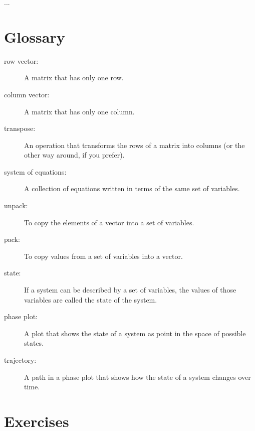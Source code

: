 ...

\section{Glossary}

\begin{description}

\item[row vector:] A matrix that has only one row.

\item[column vector:] A matrix that has only one column.

\item[transpose:] An operation that transforms the rows of a matrix
into columns (or the other way around, if you prefer).

\item[system of equations:] A collection of equations written in terms of
the same set of variables.

\item[unpack:] To copy the elements of a vector into a set of variables.

\item[pack:] To copy values from a set of variables into a vector.

\item[state:] If a system can be described by a set of variables,
the values of those variables are called the state of the system.

\item[phase plot:] A plot that shows the state of a system as point
in the space of possible states.

\item[trajectory:] A path in a phase plot that shows how the state of
a system changes over time.


\end{description}

\section{Exercises}

